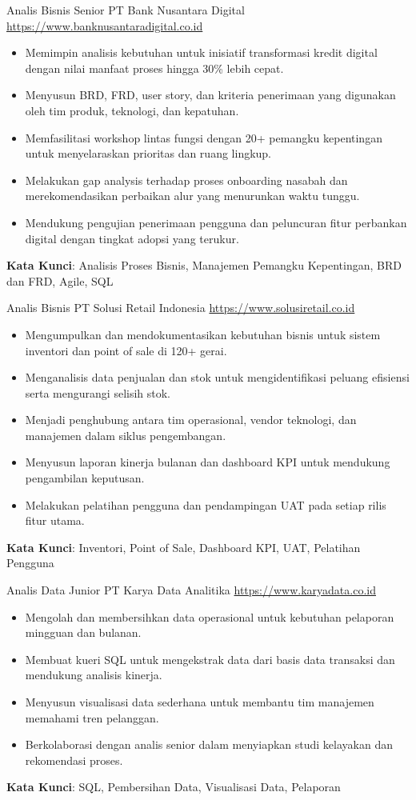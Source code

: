 \documentclass[a4paper, serif, 10pt]{moderncv}
\begin{document}
        {Analis Bisnis Senior}
        {PT Bank Nusantara Digital}
        {\url{https://www.banknusantaradigital.co.id}}
        {}
        {\begin{itemize}
\item Memimpin analisis kebutuhan untuk inisiatif transformasi kredit digital dengan nilai manfaat proses hingga 30\% lebih cepat.
\item Menyusun BRD, FRD, user story, dan kriteria penerimaan yang digunakan oleh tim produk, teknologi, dan kepatuhan.
\item Memfasilitasi workshop lintas fungsi dengan 20+ pemangku kepentingan untuk menyelaraskan prioritas dan ruang lingkup.
\item Melakukan gap analysis terhadap proses onboarding nasabah dan merekomendasikan perbaikan alur yang menurunkan waktu tunggu.
\item Mendukung pengujian penerimaan pengguna dan peluncuran fitur perbankan digital dengan tingkat adopsi yang terukur.
\end{itemize}
\textbf{Kata Kunci}: Analisis Proses Bisnis, Manajemen Pemangku Kepentingan, BRD dan FRD, Agile, SQL}

        {Analis Bisnis}
        {PT Solusi Retail Indonesia}
        {\url{https://www.solusiretail.co.id}}
        {}
        {\begin{itemize}
\item Mengumpulkan dan mendokumentasikan kebutuhan bisnis untuk sistem inventori dan point of sale di 120+ gerai.
\item Menganalisis data penjualan dan stok untuk mengidentifikasi peluang efisiensi serta mengurangi selisih stok.
\item Menjadi penghubung antara tim operasional, vendor teknologi, dan manajemen dalam siklus pengembangan.
\item Menyusun laporan kinerja bulanan dan dashboard KPI untuk mendukung pengambilan keputusan.
\item Melakukan pelatihan pengguna dan pendampingan UAT pada setiap rilis fitur utama.
\end{itemize}
\textbf{Kata Kunci}: Inventori, Point of Sale, Dashboard KPI, UAT, Pelatihan Pengguna}

        {Analis Data Junior}
        {PT Karya Data Analitika}
        {\url{https://www.karyadata.co.id}}
        {}
        {\begin{itemize}
\item Mengolah dan membersihkan data operasional untuk kebutuhan pelaporan mingguan dan bulanan.
\item Membuat kueri SQL untuk mengekstrak data dari basis data transaksi dan mendukung analisis kinerja.
\item Menyusun visualisasi data sederhana untuk membantu tim manajemen memahami tren pelanggan.
\item Berkolaborasi dengan analis senior dalam menyiapkan studi kelayakan dan rekomendasi proses.
\end{itemize}
\textbf{Kata Kunci}: SQL, Pembersihan Data, Visualisasi Data, Pelaporan}
\end{document}

